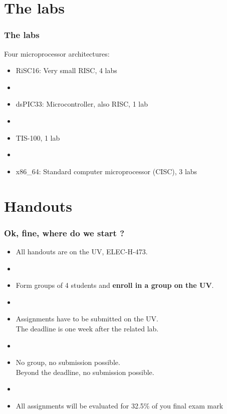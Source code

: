 \documentclass[11pt,a4paper,compress]{beamer}%
\begin{document}
\section{The labs}
\begin{frame}
\frametitle{The labs}

Four microprocessor architectures:
\begin{itemize}
\item RiSC16: Very small RISC, 4 labs
\item[]
\item dsPIC33: Microcontroller, also RISC, 1 lab
\item[]
\item TIS-100, 1 lab
\item[]
\item x86\_64: Standard computer microprocessor (CISC), 3 labs
\end{itemize}
\end{frame}

\section{Handouts}
\begin{frame}
\frametitle{Ok, fine, where do we start ?}
\begin{itemize}
\item All handouts are on the UV, ELEC-H-473.
\item[]
\item Form groups of 4 students and \textbf{enroll in a group on the UV}.
\item[]
\item Assignments have to be submitted on the UV.\\ The deadline is one week after the related lab.
\item[]
\item No group, no submission possible.\\Beyond the deadline, no submission possible.
\item[]
\item All assignments will be evaluated for 32.5\% of you final exam mark
\end{itemize}



\end{frame}
\end{document}
